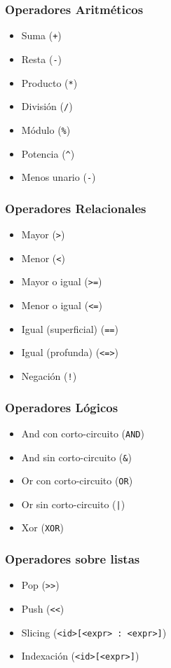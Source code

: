 \documentclass[12pt, spanish]{report}
\begin{document}
\subsubsection{Operadores Aritm\'eticos}
\begin{itemize}
\item Suma (\texttt{+})
\item Resta    (\texttt{-})
\item Producto (\texttt{*})
\item Divisi\'on  (\texttt{/})
\item M\'odulo (\texttt{\%})
\item Potencia (\texttt{\^})
\item Menos unario (\texttt{-})
\end{itemize}

\subsubsection{Operadores Relacionales}
\begin{itemize}
\item Mayor         (\texttt{>})
\item Menor         (\texttt{<})
\item Mayor o igual (\texttt{>=})
\item Menor o igual (\texttt{<=})
\item Igual (superficial) (\texttt{==})
\item Igual (profunda)    (\texttt{<=>})
\item Negaci\'on      (\texttt{!})
\end{itemize}

\subsubsection{Operadores L\'ogicos}
\begin{itemize}
\item And con corto-circuito (\texttt{AND})
\item And sin corto-circuito (\texttt{\&})
\item Or con corto-circuito  (\texttt{OR})
\item Or sin corto-circuito  (\texttt{|})
\item Xor (\texttt{XOR})
\end{itemize}

\subsubsection{Operadores sobre listas}
\begin{itemize}
\item Pop          (\texttt{\textgreater \textgreater})
\item Push         (\texttt{\textless \textless})
\item Slicing      (\texttt{<id>[<expr> : <expr>]})
\item Indexaci\'on (\texttt{<id>[<expr>]})
\end{itemize}
\end{document}
